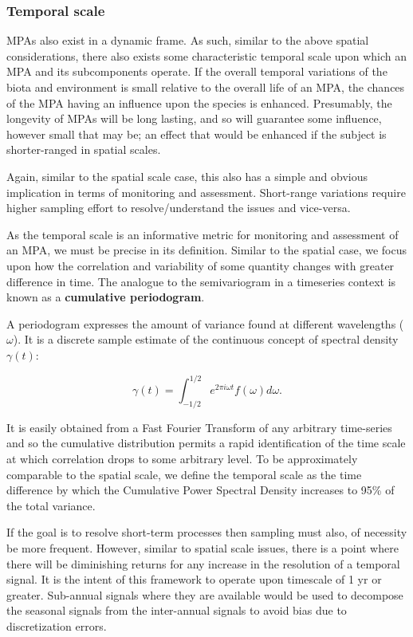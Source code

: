 \documentclass[letterpaper,portrait,11pt]{scrartcl}
\numberwithin{equation}{section}    %
\numberwithin{figure}{section}    %
\numberwithin{table}{section}       %
\begin{document}
\subsubsection{Temporal scale}
\label{sec:interpolationTS}

MPAs also exist in a dynamic frame. As such, similar to the above spatial considerations, there also exists some characteristic temporal scale upon which an MPA and its subcomponents operate. If the overall temporal variations of the biota and environment is small relative to the overall life of an MPA, the chances of the MPA having an influence upon the species is enhanced. Presumably, the longevity of MPAs will be long lasting, and so will guarantee some influence, however small that may be; an effect that would be enhanced if the subject is shorter-ranged in spatial scales.

Again, similar to the spatial scale case, this also has a simple and obvious implication in terms of monitoring and assessment. Short-range variations require higher sampling effort to resolve/understand the issues and vice-versa.

As the temporal scale is an informative metric for monitoring and assessment of an MPA, we must be precise in its definition. Similar to the spatial case, we focus upon how the correlation and variability of some quantity changes with greater difference in time. The analogue to the semivariogram in a timeseries context is known as a \textbf{cumulative periodogram}.

A periodogram expresses the amount of variance found at different wavelengths ($\omega$). It is a discrete sample estimate of the continuous concept of spectral density $\gamma(t)$:

\begin{equation}
  \label{eq:spectraldDensity}
  \gamma(t) = \int_{-1/2}^{1/2} e^{2\pi i \omega t} f(\omega) d \omega.
\end{equation}


It is easily obtained from a Fast Fourier Transform of any arbitrary time-series and so the cumulative distribution permits a rapid identification of the time scale at which correlation drops to some arbitrary level. To be approximately comparable to the spatial scale, we define the temporal scale as the time difference by which the Cumulative Power Spectral Density increases to 95\% of the total variance.

If the goal is to resolve short-term processes then sampling must also, of necessity be more frequent. However, similar to spatial scale issues, there is a point where there will be diminishing returns for any increase in the resolution of a temporal signal. It is the intent of this framework to operate upon timescale of 1 yr or greater. Sub-annual signals where they are available would be used to decompose the seasonal signals from the inter-annual signals to avoid bias due to discretization errors.
\end{document}
